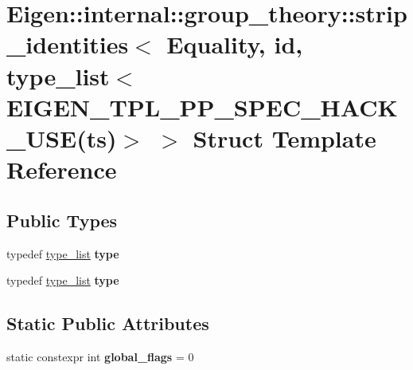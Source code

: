 \hypertarget{struct_eigen_1_1internal_1_1group__theory_1_1strip__identities_3_01_equality_00_01id_00_01type__910db64a8d6fcf148be1d9764b935ba6}{}\section{Eigen\+:\+:internal\+:\+:group\+\_\+theory\+:\+:strip\+\_\+identities$<$ Equality, id, type\+\_\+list$<$ E\+I\+G\+E\+N\+\_\+\+T\+P\+L\+\_\+\+P\+P\+\_\+\+S\+P\+E\+C\+\_\+\+H\+A\+C\+K\+\_\+\+U\+SE(ts)$>$ $>$ Struct Template Reference}
\label{struct_eigen_1_1internal_1_1group__theory_1_1strip__identities_3_01_equality_00_01id_00_01type__910db64a8d6fcf148be1d9764b935ba6}
\subsection*{Public Types}
\begin{DoxyCompactItemize}
\item 
\mbox{\label{struct_eigen_1_1internal_1_1group__theory_1_1strip__identities_3_01_equality_00_01id_00_01type__910db64a8d6fcf148be1d9764b935ba6_a990b0478a352c8f7f54d52eece01615b}} 
typedef \hyperlink{struct_eigen_1_1internal_1_1type__list}{type\+\_\+list} {\bfseries type}
\item 
\mbox{\label{struct_eigen_1_1internal_1_1group__theory_1_1strip__identities_3_01_equality_00_01id_00_01type__910db64a8d6fcf148be1d9764b935ba6_a990b0478a352c8f7f54d52eece01615b}} 
typedef \hyperlink{struct_eigen_1_1internal_1_1type__list}{type\+\_\+list} {\bfseries type}
\end{DoxyCompactItemize}
\subsection*{Static Public Attributes}
\begin{DoxyCompactItemize}
\item 
\mbox{\label{struct_eigen_1_1internal_1_1group__theory_1_1strip__identities_3_01_equality_00_01id_00_01type__910db64a8d6fcf148be1d9764b935ba6_a3ef6b4c387c1164224400c8900af3479}} 
static constexpr int {\bfseries global\+\_\+flags} = 0
\end{DoxyCompactItemize}


